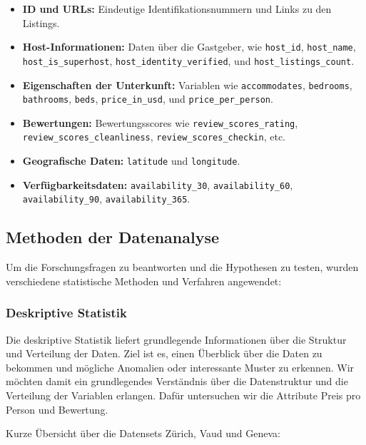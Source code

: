 \documentclass[
  journal,
]{IEEEtran}%
\begin{document}
\begin{itemize}
\item
  \textbf{ID und URLs:} Eindeutige Identifikationsnummern und Links zu
  den Listings.
\item
  \textbf{Host-Informationen:} Daten über die Gastgeber, wie
  \texttt{host\_id}, \texttt{host\_name}, \texttt{host\_is\_superhost},
  \texttt{host\_identity\_verified}, und \texttt{host\_listings\_count}.
\item
  \textbf{Eigenschaften der Unterkunft:} Variablen wie
  \texttt{accommodates}, \texttt{bedrooms}, \texttt{bathrooms},
  \texttt{beds}, \texttt{price\_in\_usd}, und
  \texttt{price\_per\_person}.
\item
  \textbf{Bewertungen:} Bewertungsscores wie
  \texttt{review\_scores\_rating}, \texttt{review\_scores\_cleanliness},
  \texttt{review\_scores\_checkin}, etc.
\item
  \textbf{Geografische Daten:} \texttt{latitude} und \texttt{longitude}.
\item
  \textbf{Verfügbarkeitsdaten:} \texttt{availability\_30},
  \texttt{availability\_60}, \texttt{availability\_90},
  \texttt{availability\_365}.
\end{itemize}

\hypertarget{methoden-der-datenanalyse}{%
\subsection{Methoden der Datenanalyse}\label{methoden-der-datenanalyse}}

Um die Forschungsfragen zu beantworten und die Hypothesen zu testen,
wurden verschiedene statistische Methoden und Verfahren angewendet:

\hypertarget{deskriptive-statistik}{%
\subsubsection{\texorpdfstring{\textbf{Deskriptive
Statistik}}{Deskriptive Statistik}}\label{deskriptive-statistik}}

Die deskriptive Statistik liefert grundlegende Informationen über die
Struktur und Verteilung der Daten. Ziel ist es, einen Überblick über die
Daten zu bekommen und mögliche Anomalien oder interessante Muster zu
erkennen. Wir möchten damit ein grundlegendes Verständnis über die
Datenstruktur und die Verteilung der Variablen erlangen. Dafür
untersuchen wir die Attribute Preis pro Person und Bewertung.

Kurze Übersicht über die Datensets Zürich, Vaud und Geneva:
\end{document}
